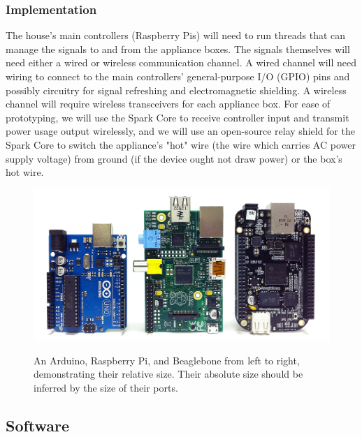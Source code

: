 	\subsubsection{Implementation}
	
		The house's main controllers (Raspberry Pis) will need to run threads that can manage the signals to and from the appliance boxes. The signals themselves will need either a wired or wireless communication channel. A wired channel will need wiring to connect to the main controllers' general-purpose I/O (GPIO) pins and possibly circuitry for signal refreshing and electromagnetic shielding. A wireless channel will require wireless transceivers for each appliance box. For ease of prototyping, we will use the Spark Core to receive controller input and transmit power usage output wirelessly, and we will use an open-source relay shield for the Spark Core to switch the appliance's "hot" wire (the wire which carries AC power supply voltage) from ground (if the device ought not draw power) or the box's hot wire.
		
\begin{figure}
	\centering
	\caption{An Arduino, Raspberry Pi, and Beaglebone from left to right, demonstrating their relative size.  Their absolute size should be inferred by the size of their ports.}
	\includegraphics[width=.9\textwidth]{gfx/pi-arduino-beaglebone.jpg}
	\label{fig:pi-arduino-beaglebone}
\end{figure}
	
	\subsection{Software}
	
